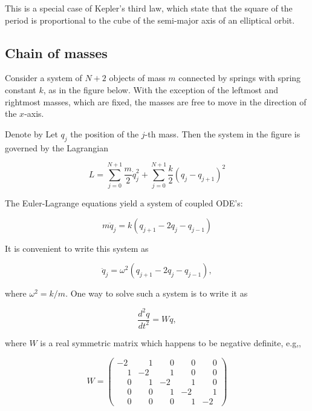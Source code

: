 This is a special case of Kepler's third law, which state that the square of the period is proportional to the cube of the semi-major axis of an elliptical orbit.





\subsection{Chain of masses}

Consider a system of $N+2$ objects of mass $m$ connected by springs with spring constant $k$, as in the figure below.  With the exception of the leftmost and rightmost masses, which are fixed, the masses are free to move in the direction of the $x$-axis. 


Denote by Let $q_j$ the position of the $j$-th mass.  Then the system in the figure is governed by the Lagrangian

\begin{equation}
L = \sum_{j=0}^{N+1}\frac{m}{2} \dot q_j^2
+ \sum_{j=0}^{N+1}\frac{k}{2}  (q_j - q_{j+1})^2
\end{equation}

The Euler-Lagrange equations yield a system of coupled ODE's:

\begin{equation}
m\ddot q_j = k(q_{j+1} - 2q_j - q_{j-1} )
\end{equation}

It is convenient to write this system as

\begin{equation}
\label{discretestringodes}
\ddot q_j = \omega^2(q_{j+1} - 2q_j - q_{j-1} ),
\end{equation}

where $\omega^2 = k/m$.
One way to solve such a system is to write it as

\begin{equation}
\label{discretestringeqmo}
\frac{d^2 q}{dt^2} = Wq,
\end{equation}

where $W$ is a real symmetric matrix which happens to be negative definite, e.g,,

\begin{equation}
W =
\begin{pmatrix}
-2 & \phantom{-}1 & \phantom{-}0 & \phantom{-}0 & \phantom{-}0 \\
\phantom{-}1 & -2 & \phantom{-}1 & \phantom{-}0 & \phantom{-}0 \\
\phantom{-}0 & \phantom{-}1 & -2 & \phantom{-}1 & \phantom{-}0 \\
\phantom{-}0 & \phantom{-}0 & \phantom{-}1 & -2 & \phantom{-}1 \\
\phantom{-}0 & \phantom{-}0 & \phantom{-}0 & \phantom{-}1 & -2
\end{pmatrix}
\end{equation}

